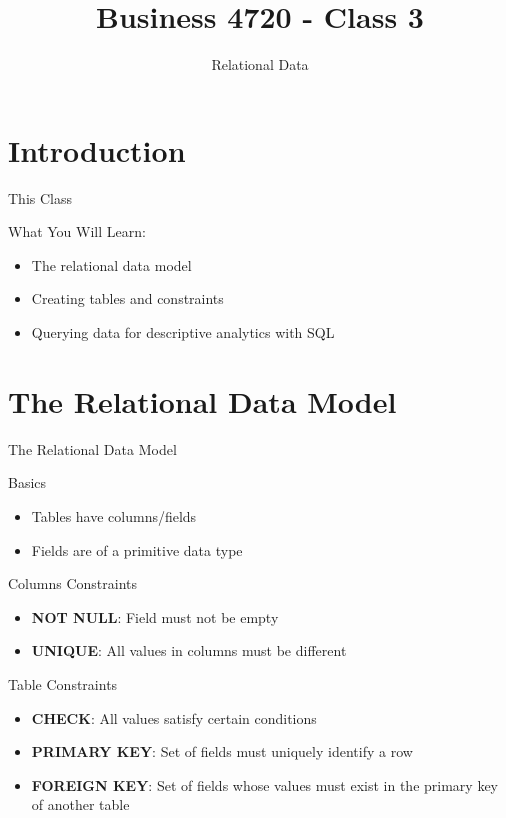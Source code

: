 \documentclass[ignorenonframetext,xcolor=x11names]{beamer}
\title{Business 4720 - Class 3}
\subtitle{Relational Data}
\begin{document}
\begin{frame}{}
  \titlepage
  \footnotesize
  
\end{frame}

\section{Introduction}

\begin{frame}{This Class}

\begin{block}{What You Will Learn:}
\begin{itemize}
  \item The relational data model
  \item Creating tables and constraints
  \item Querying data for descriptive analytics with SQL
\end{itemize}
\end{block}
\end{frame}

\section{The Relational Data Model}

\begin{frame}{The Relational Data Model}

\begin{block}{Basics}
\begin{itemize}
	\item Tables have columns/fields
	\item Fields are of a primitive data type
\end{itemize}
\end{block}
\begin{block}{Columns Constraints}
\begin{itemize}
	\item \textbf{NOT NULL}: Field must not be empty
	\item \textbf{UNIQUE}: All values in columns must be different
\end{itemize}
\end{block}
\begin{block}{Table Constraints}
\begin{itemize}
	\item \textbf{CHECK}: All values satisfy certain conditions
	\item \textbf{PRIMARY KEY}: Set of fields must uniquely identify a row
	\item \textbf{FOREIGN KEY}: Set of fields whose values must exist in the primary key of another table
\end{itemize}
\end{block}
\end{frame}
\end{document}
